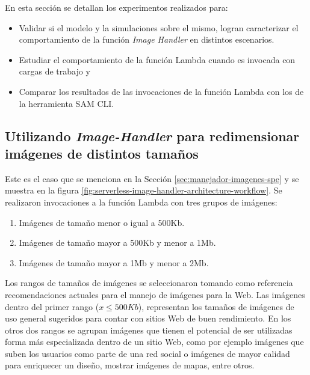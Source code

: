 En esta sección se detallan los experimentos realizados para:
\begin{itemize}
    \item Validar si el modelo y la simulaciones sobre el mismo, logran caracterizar el comportamiento de la función \emph{Image Handler} en distintos escenarios. 
    \item Estudiar el comportamiento de la función Lambda cuando es invocada con cargas de trabajo y
    \item Comparar los resultados de las invocaciones de la función Lambda con los de la herramienta SAM CLI.
\end{itemize}

\subsection{Utilizando \emph{Image-Handler} para redimensionar imágenes de distintos tamaños} \label{sec:experimento-1}

Este es el caso que se menciona en la Sección \ref{sec:manejador-imagenes-spe} y se muestra en la figura \ref{fig:serverless-image-handler-architecture-workflow}. Se realizaron invocaciones a la función Lambda con tres grupos de imágenes:
\begin{enumerate}
    \item Imágenes de tamaño menor o igual a 500Kb.
    \item Imágenes de tamaño mayor a 500Kb y menor a 1Mb.
    \item Imágenes de tamaño mayor a 1Mb y menor a 2Mb.
\end{enumerate}
Los rangos de tamaños de imágenes se seleccionaron tomando como referencia recomendaciones actuales para el manejo de imágenes para la Web. Las imágenes dentro del primer rango ($x \leq 500Kb$), representan los tamaños de imágenes de uso general sugeridos para contar con sitios Web de buen rendimiento. En los otros dos rangos se agrupan imágenes que tienen el potencial de ser utilizadas forma más especializada dentro de un sitio Web, como por ejemplo imágenes que suben los usuarios como parte de una red social o imágenes de mayor calidad para enriquecer un diseño, mostrar imágenes de mapas, entre otros.


